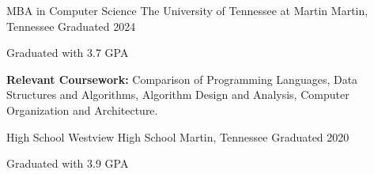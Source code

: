
\begin{cventries}
  \cventry
    {MBA in Computer Science} %
    {The University of Tennessee at Martin} %
    {Martin, Tennessee} %
    {Graduated 2024} %
    {
      \begin{cvitems} %
        \item {Graduated with 3.7 GPA}
        \item {\textbf{Relevant Coursework:} Comparison of Programming Languages, Data Structures and Algorithms, Algorithm Design and Analysis, Computer Organization and Architecture.} 
      \end{cvitems}
    }
    
  \vspace{1em}
  
  \cventry
    {High School} %
    {Westview High School} %
    {Martin, Tennessee} %
    {Graduated 2020} %
    {
      \begin{cvitems} %
        \item {Graduated with 3.9 GPA}
      \end{cvitems}
    }

\end{cventries}
